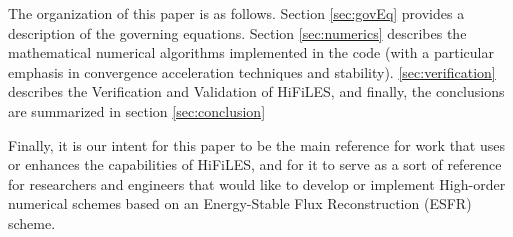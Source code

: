 The organization of this paper is as follows. Section \ref{sec:govEq} provides a description of the governing equations. Section \ref{sec:numerics} describes the mathematical numerical algorithms implemented in the code (with a particular emphasis in convergence acceleration techniques and stability). \ref{sec:verification} describes the Verification and Validation of HiFiLES, and finally, the conclusions are summarized in section \ref{sec:conclusion}

Finally, it is our intent for this paper to be the main reference for work that uses or enhances the capabilities of HiFiLES, and for it to serve as a sort of reference for researchers and engineers that would like to develop or implement High-order numerical schemes based on an Energy-Stable Flux Reconstruction (ESFR) scheme.